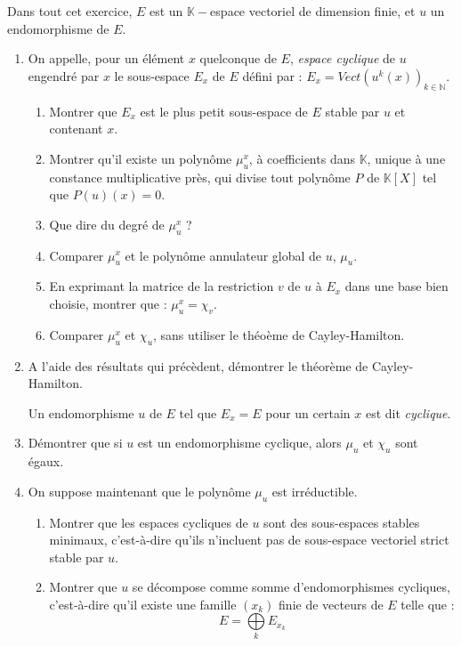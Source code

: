 \begin{exer}
Dans tout cet exercice, $E$ est un $\mathbb{K}-$espace vectoriel de dimension finie, et $u$ un endomorphisme de $E$.
\begin{enumerate}
\item On appelle, pour un \'el\'ement $x$ quelconque de $E$, \textit{espace cyclique} de $u$ engendr\'e par $x$ le sous-espace $E_x$ de $E$ d\'efini par : $E_x=Vect (u^k(x))_{k\in\mathbb{N}}$.
\begin{enumerate}
\item Montrer que $E_x$ est le plus petit sous-espace de $E$ stable par $u$ et contenant $x$.
\item Montrer qu'il existe un polyn\^ome $\mu_u^x$, \`a coefficients dans $\mathbb{K}$, %
unique \`a une constance multiplicative pr\`es, qui divise tout polyn\^ome $P$ de $\mathbb{K}[X]$ tel que $P(u)(x)=0$.
\item Que dire du degr\'e de $\mu_u^x$ ?
\item Comparer $\mu_u^x$ et le polyn\^ome annulateur global de $u$, $\mu_u$.
\item En exprimant la matrice de la restriction $v$ de $u$ \`a $E_x$ dans une base bien choisie, %
montrer que : $\mu_u^x=\chi_v$.
\item Comparer $\mu_u^x$ et $\chi_u$, sans utiliser le th\'eo\`eme de Cayley-Hamilton.
\end{enumerate}
\item A l'aide des r\'esultats qui pr\'ec\`edent, d\'emontrer le th\'eor\`eme de Cayley-Hamilton.

\smallskip
Un endomorphisme $u$ de $E$ tel que $E_x=E$ pour un certain $x$ est dit \textit{cyclique}.
\item D\'emontrer que si $u$ est un endomorphisme cyclique, alors $\mu_u$ et $\chi_u$ sont \'egaux.
\item On suppose maintenant que le polyn\^ome $\mu_u$ est irr\'eductible.
\begin{enumerate}
\item Montrer que les espaces cycliques de $u$ sont des sous-espaces stables minimaux, %
c'est-\`a-dire qu'ils n'incluent pas de sous-espace vectoriel strict stable par $u$.
\item Montrer que $u$ se d\'ecompose comme somme d'endomorphismes cycliques, %
c'est-\`a-dire qu'il existe une famille $(x_k)$ finie de vecteurs de $E$ telle que :
\[E=\bigoplus\limits_k E_{x_k}\]
\end{enumerate}
\end{enumerate}
\end{exer}

